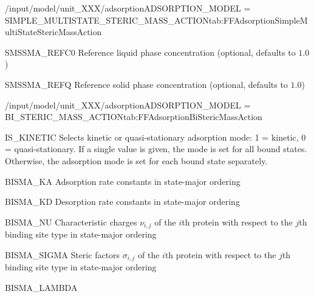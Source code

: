\begin{condsubgroup}{/input/model/unit\_XXX/adsorption}{ADSORPTION\_MODEL = SIMPLE\_MULTISTATE\_STERIC\_MASS\_ACTION}{tab:FFAdsorptionSimpleMultiStateStericMassAction}
\begin{dataset}[unit=\si{\mol\per\raiseto{3}\metre\of{MP}}, type = double, range={$> 0$}, length={1}]{SMSSMA\_REFC0}
    Reference liquid phase concentration (optional, defaults to $1.0$) 
  \end{dataset} 
  \begin{dataset}[unit=\si{\mol\per\raiseto{3}\metre\of{SP}}, type = double, range={$> 0$}, length={1}]{SMSSMA\_REFQ} 
    Reference solid phase concentration (optional, defaults to $1.0$)
  \end{dataset} 
\end{condsubgroup}

\begin{condsubgroup}{/input/model/unit\_XXX/adsorption}{ADSORPTION\_MODEL = BI\_STERIC\_MASS\_ACTION}{tab:FFAdsorptionBiStericMassAction}
\begin{dataset}[type=int,range={$\{ 0,1 \}$},length={1 / \texttt{NTOTALBND}}]{IS\_KINETIC}
    Selects kinetic or quasi-stationary adsorption mode: 1 = kinetic, 0 = quasi-stationary.
    If a single value is given, the mode is set for all bound states.
    Otherwise, the adsorption mode is set for each bound state separately.
  \end{dataset}
  \begin{dataset}[unit=\si{\raiseto{3}\metre\of{MP}\per\raiseto{3}\metre\of{SP}\per\second}, type = double, range={$\geq 0.0$}, length={$\texttt{NSTATES} \cdot \texttt{NCOMP}$}]{BISMA\_KA} 
    Adsorption rate constants in state-major ordering
  \end{dataset} 
  \begin{dataset}[unit=\si{\per\second}, type = double, range={$\geq 0.0$}, length={$\texttt{NSTATES} \cdot \texttt{NCOMP}$}]{BISMA\_KD} 
    Desorption rate constants in state-major ordering
  \end{dataset} 
  \begin{dataset}[unit=\si{\per\second}, type = double, range={$\geq 0.0$}, length={$\texttt{NSTATES} \cdot \texttt{NCOMP}$}]{BISMA\_NU} 
    Characteristic charges $\nu_{i,j}$ of the $i$th protein with respect to the $j$th binding site type in state-major ordering
  \end{dataset} 
  \begin{dataset}[unit=\si{\per\second}, type = double, range={$\geq 0.0$}, length={$\texttt{NSTATES} \cdot \texttt{NCOMP}$}]{BISMA\_SIGMA} 
    Steric factors $\sigma_{i,j}$ of the $i$th protein with respect to the $j$th binding site type in state-major ordering
  \end{dataset} 
  \begin{dataset}[unit=\si{\mol\per\cubic\metre\of{SP}}, type = double, range={$\geq 0.0$}, length={\texttt{NSTATES}}]{BISMA\_LAMBDA} 

\end{dataset}
\end{condsubgroup}
